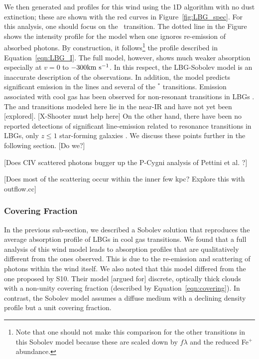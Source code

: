 \documentclass[12pt,preprint]{aastex}
\begin{document}
We then generated  and  profiles for this wind
using the 1D algorithm with no dust extinction; these are shown with
the red curves in Figure~\ref{fig:LBG_spec}.   For this analysis, one
should focus on the \mgiia\ transition.  The dotted line in the Figure
shows the intensity profile for the model when one ignores re-emission
of absorbed photons.  By construction, it follows\footnote{Note that
  one should not make this comparison for the other transitions in
  this Sobolev model because these are scaled down by $f\lambda$ and
  the reduced Fe$^+$ abundance.} the profile
described in Equation~\ref{eqn:LBG_I}.   The full model, however,
shows much weaker absorption especially at $v = 0$ to $-300 {\rm km~s^{-1}}$.
In this respect, the LBG-Sobolev model is an
inaccurate description of the observations.  In addition, the model
predicts significant emission in the  lines and several of
the $^*$ transitions.   Emission associated with cool gas
has been observed for non-resonant 
transitions in LBGs \citep{cb58,shapley}.
The  and  transitions
  modeled here lie in the near-IR and have not yet been [explored].
  [X-Shooter must help here]  On the other hand, there have been no 
reported detections of significant line-emission related to resonance
transitions in LBGs, only $z \le 1$ star-forming galaxies
\citep{wcp+09,rubin09}.  We discuss these points further in the
following section. [Do we?]

[Does CIV scattered photons bugger up the P-Cygni analysis of Pettini
et al. ?]
 
[Does most of the scattering occur within the inner few kpc? Explore
this with outflow.cc]

\subsubsection{Covering Fraction}
\label{sec:Covering}

In the previous sub-section, we described a Sobolev solution that
reproduces the average absorption profile of LBGs in cool gas
transitions.  We found that a full analysis of this wind model leads
to absorption profiles that are qualitatively different from the ones
observed.  This is due to the re-emission and scattering of photons
within the wind itself.  We also noted that this model differed from
the one proposed by S10.  Their model [argued for] discrete, optically
thick clouds with a non-unity covering fraction (described by
Equation~\ref{eqn:covering}).   In contrast, the Sobolev model assumes
a diffuse medium with a declining density profile but a unit covering
fraction.
\end{document}
